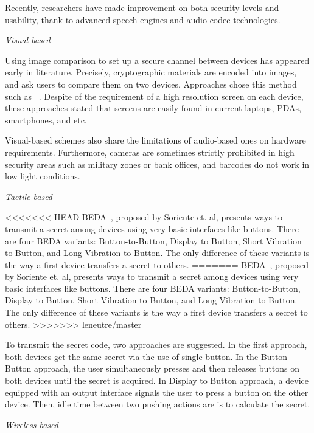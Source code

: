Recently, researchers have made improvement on both security levels and usability, thank to advanced speech engines and audio codec technologies. 

\emph{Visual-based}

Using image comparison to set up a secure channel between devices has appeared early in literature. Precisely, cryptographic materials are encoded into images, and ask users to compare them on two devices. Approaches chose this method such as ~\cite{Goodrich:2009:UAS:1509221.1509226,1425062,Perrig99hashvisualization,Ellison:2003:PSG:950191.950195,1624021}. Despite of the requirement of a high resolution screen on each device, these approaches stated that screens are easily found in current laptops, PDAs, smartphones, and etc. 

Visual-based schemes also share the limitations of audio-based ones on hardware requirements. Furthermore, cameras are sometimes strictly prohibited in high security areas such as military zones or bank offices, and barcodes do not work in low light conditions. 

\emph{Tactile-based}

<<<<<<< HEAD
BEDA~\cite{Soriente07beda:button-enabled}, proposed by Soriente et. al, presents ways to transmit a secret among devices using very basic interfaces like buttons. There are four BEDA variants: Button-to-Button, Display to Button, Short Vibration to Button, and Long Vibration to Button. The only difference of these variants is the way a first device transfers a secret to others.
=======
BEDA~\cite{Soriente07beda:button-enabled}, proposed by Soriente et. al, presents ways to transmit a secret among devices using very basic interfaces like buttons. There are four BEDA variants: Button-to-Button, Display to Button, Short Vibration to Button, and Long Vibration to Button. The only difference of these variants is the way a first device transfers a secret to others. 
>>>>>>> leneutre/master

To transmit the secret code, two approaches are suggested. In the first approach, both devices get the same secret via the use of single button. In the Button-Button approach, the user simultaneously presses and then releases buttons on both devices until the secret is acquired. In Display to Button approach, a device equipped with an output interface signals the user to press a button on the other device. Then, idle time between two pushing actions are is to calculate the secret. 

\emph{Wireless-based}

